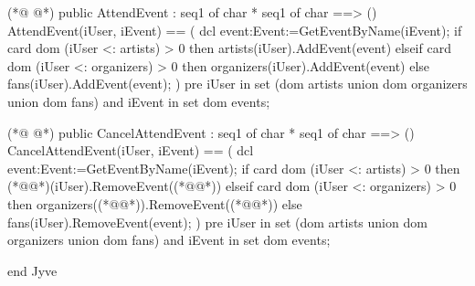 \begin{vdmpp}[breaklines=true]
(*@
\label{AttendEvent:168}
@*)
 public AttendEvent : seq1 of char * seq1 of char ==> ()
 AttendEvent(iUser, iEvent) == (
  dcl event:Event:=GetEventByName(iEvent);
  if card dom ({iUser} <: artists) > 0 then
   artists(iUser).AddEvent(event)
  elseif card dom ({iUser} <: organizers) > 0  then
   organizers(iUser).AddEvent(event)
  else
   fans(iUser).AddEvent(event);
 )
  pre 
   iUser in set (dom artists union dom organizers union dom fans) and
   iEvent in set dom events;
   
(*@
\label{CancelAttendEvent:182}
@*)
 public CancelAttendEvent : seq1 of char * seq1 of char ==> ()
 CancelAttendEvent(iUser, iEvent) == (
  dcl event:Event:=GetEventByName(iEvent);
  if card dom ({iUser} <: artists) > 0 then
   (*@@*)(iUser).RemoveEvent((*@@*))
  elseif card dom ({iUser} <: organizers) > 0 then
   organizers((*@@*)).RemoveEvent((*@@*))
  else
   fans(iUser).RemoveEvent(event);
 )
  pre 
   iUser in set (dom artists union dom organizers union dom fans) and
   iEvent in set dom events;
   
  
end Jyve
\end{vdmpp}
\bigskip
